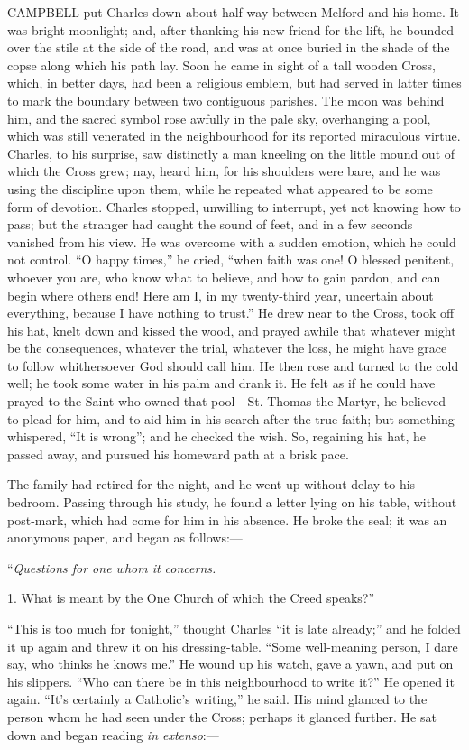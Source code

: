 CAMPBELL put Charles down about
half-way between Melford and his home. It was bright moonlight; and,
after thanking his new friend for the lift, he bounded over the stile
at the side of the road, and was at once buried in the shade of the
copse along which his path lay. Soon he came in sight of a tall wooden
Cross, which, in better days, had been a religious emblem, but had
served in latter times to mark the boundary between two contiguous
parishes. The moon was behind him, and the sacred symbol rose awfully
in the pale sky, overhanging a pool, which was still venerated in the
neighbourhood for its reported miraculous virtue. Charles, to his
surprise, saw distinctly a man kneeling on the little mound out of
which the Cross grew; nay, heard him, for his shoulders were bare, and
he was using the discipline upon them, while he repeated what appeared
to be some form of devotion. Charles stopped, unwilling to interrupt,
yet not knowing how to pass; but the stranger had caught the sound of
feet, and in a few seconds vanished from his view. He was overcome
with a sudden emotion, which he could not control. ``O happy
times,'' he cried, ``when faith was one! O blessed
penitent, whoever you are, who know what to believe, and how to gain
pardon, and can begin where others end! Here am I, in my twenty-third
year, uncertain about everything, because I have nothing to
trust.'' He drew near to the Cross, took off his hat, knelt down
and kissed the wood, and prayed awhile that whatever might be the
consequences, whatever the trial, whatever the loss, he might have
grace to follow whithersoever God should call him. He then rose and
turned to the cold well; he took some water in his palm and drank it.
He felt as if he could have prayed to the Saint who owned that pool—St.
Thomas the Martyr, he believed—to plead for him, and to aid him in
his search after the true faith; but something whispered, ``It is
wrong''; and he checked the wish. So, regaining his hat, he passed
away, and pursued his homeward path at a brisk pace.

The family had retired for the night, and he went up without delay
to his bedroom. Passing through his study, he found a letter lying on
his table, without post-mark, which had come for him in his absence.
He broke the seal; it was an anonymous paper, and began as follows:—

``\emph{Questions for one whom it concerns.}

1. What is meant by the One Church of which the Creed speaks?''

``This is too much for tonight,'' thought Charles ``it
is late already;'' and he folded it up again and threw it on his
dressing-table. ``Some well-meaning person, I dare say, who
thinks he knows me.'' He wound up his watch, gave a yawn, and put
on his slippers. ``Who can there be in this neighbourhood to write
it?'' He opened it again. ``It's certainly a Catholic's
writing,'' he said. His mind glanced to the person whom he had
seen under the Cross; perhaps it glanced further. He sat down and
began reading \emph{in extenso}:—

